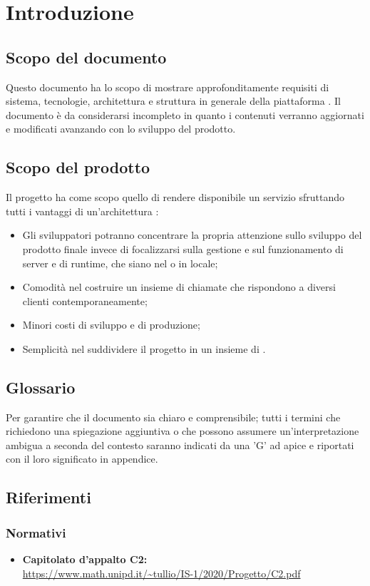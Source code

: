 \section{Introduzione}
\label{introduzione}
\subsection{Scopo del documento}
Questo documento ha lo scopo di mostrare approfonditamente requisiti di sistema, tecnologie, architettura e struttura in generale della piattaforma \NomeProgetto. Il documento è da considerarsi incompleto in quanto i contenuti verranno aggiornati e modificati avanzando con lo sviluppo del prodotto.
\subsection{Scopo del prodotto} 
Il progetto {\NomeProgetto} ha come scopo quello di rendere disponibile un servizio  sfruttando tutti i vantaggi di un'architettura :
\begin{itemize}
	\item Gli sviluppatori potranno concentrare la propria attenzione sullo sviluppo del prodotto finale invece di focalizzarsi sulla gestione e sul funzionamento di server e di runtime, che siano nel  o in locale;
	\item Comodità nel costruire un insieme di chiamate  che rispondono a diversi clienti contemporaneamente;
	\item Minori costi di sviluppo e di produzione;
	\item Semplicità nel suddividere il progetto in un insieme di .
\end{itemize}
\subsection{Glossario}
Per garantire che il documento sia chiaro e comprensibile; tutti i termini che richiedono una spiegazione aggiuntiva o che possono assumere un'interpretazione ambigua a seconda del contesto saranno indicati da una 'G' ad apice e riportati con il loro significato in appendice.
\subsection{Riferimenti}
\subsubsection{Normativi}
\begin{itemize}
	\item \textbf{Capitolato d'appalto C2:}\\
	\url{https://www.math.unipd.it/~tullio/IS-1/2020/Progetto/C2.pdf}
\end{itemize}
